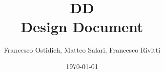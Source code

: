 
\title{\Huge DD \\[4mm] \Large Design Document \\[4mm]}
\author{Francesco Ostidich, Matteo Salari, Francesco Rivitti}
\date{\today}
\maketitle
\vspace{12mm}
\tableofcontents
\newpage

